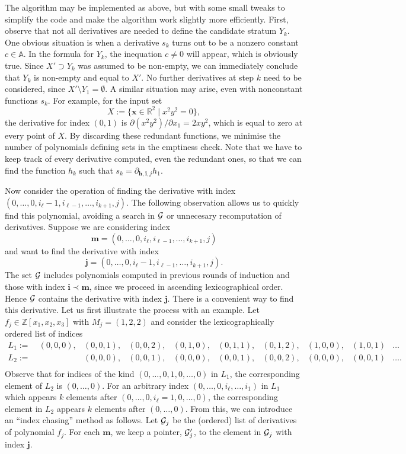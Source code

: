 \documentclass[
]{book}
\theoremstyle{definition}
\theoremstyle{definition}
\theoremstyle{definition}
\theoremstyle{definition}
\theoremstyle{remark}
\begin{document}
The algorithm may be implemented as above, but with some small tweaks to simplify the code and make the algorithm work slightly more efficiently.
First, observe that not all derivatives are needed to define the candidate stratum \(Y_k\). One obvious situation is when a derivative \(s_k\) turns out to be a nonzero constant \(c \in \mathbb{A}\).
In the formula for \(Y_k\), the inequation \(c \ne 0\) will appear, which is obviously true. Since \(X' \supset Y_k\) was assumed to be non-empty, we can immediately conclude that \(Y_k\) is non-empty and equal to \(X'\). No further derivatives at step \(k\) need to be considered, since \(X' \setminus Y_1 = \emptyset\).
A similar situation may arise, even with nonconstant functions \(s_k\). For example, for the input set
\[
X := \{ \mathbf{x} \in \mathbb{R}^2 \mid x^2 y^2 = 0 \},
\]
the derivative for index \((0,1)\) is \(\partial (x^2 y^2) / \partial x_1 = 2x y^2\), which is equal to zero at every point of \(X\).
By discarding these redundant functions, we minimise the number of polynomials defining sets in the emptiness check. Note that we have to keep track of every derivative computed, even the redundant ones, so that we can find the function \(h_k\) such that \(s_k = \partial_{\mathbf{h}, \mathbf{i}, j} h_1\).

Now consider the operation of finding the derivative with index \((0,\ldots,0,i_\ell - 1,i_{\ell - 1}, \ldots, i_{k+1},j)\). The following observation allows us to quickly find this polynomial, avoiding a search in \(\cal G\) or unnecesary recomputation of derivatives.
Suppose we are considering index
\[
\mathbf{m} = (0,\ldots,0,i_\ell,i_{\ell - 1},\ldots,i_{k+1},j)\]
and want to find the derivative with index
\[
\mathbf{j} = (0,\ldots,0,i_\ell - 1,i_{\ell - 1},\ldots,i_{k+1},j).\]
The set \(\cal G\) includes polynomials computed in previous rounds of induction and those with index \(\mathbf{i} \prec \mathbf{m}\), since we proceed in ascending lexicographical order. Hence \(\cal G\) contains the derivative with index \(\mathbf{j}\).
There is a convenient way to find this derivative.
Let us first illustrate the process with an example. Let \(f_j \in \mathbb{Z}[x_1,x_2,x_3]\) with \(M_j = (1,2,2)\) and consider the lexicographically ordered list of indices
\[
\begin{matrix}
L_1 :=\ &  (0,0,0),&(0,0,1),&(0,0,2),&(0,1,0),&(0,1,1),&(0,1,2),&(1,0,0),&(1,0,1)&\ldots\\
L_2 := \ & & (0,0,0),&(0,0,1),&(0,0,0),&(0,0,1),&(0,0,2),&(0,0,0),&(0,0,1)&\ldots.\\
\end{matrix}
\]
Observe that for indices of the kind \((0,\ldots,0,1,0,\ldots,0)\) in \(L_1\), the corresponding element of \(L_2\) is \((0,\ldots,0)\). For an arbitrary index \((0,\ldots,0,i_\ell,\ldots,i_1)\) in \(L_1\) which appears \(k\) elements after \((0,\ldots,0,i_\ell = 1,0,\ldots,0)\), the corresponding element in \(L_2\) appears \(k\) elements after \((0,\ldots,0)\).
From this, we can introduce an ``index chasing'' method as follows. Let \({\cal G}_j\) be the (ordered) list of derivatives of polynomial \(f_j\). For each \(\mathbf{m}\), we keep a pointer, \({\cal G}'_j\), to the element in \({\cal G}_j\) with index \(\mathbf{j}\).
\end{document}
